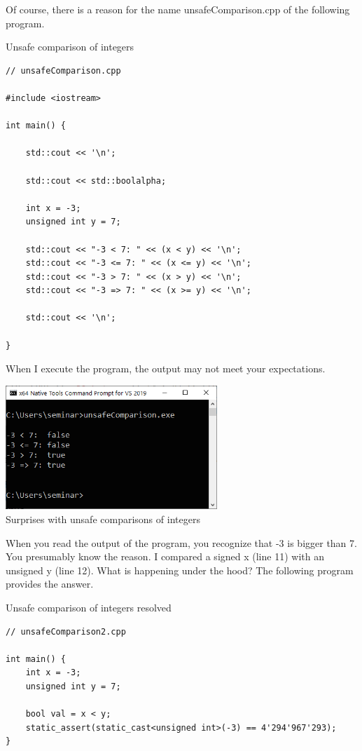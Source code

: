 Of course, there is a reason for the name unsafeComparison.cpp of the following program.

\noindent
Unsafe comparison of integers
\begin{lstlisting}[style=styleCXX]
// unsafeComparison.cpp

#include <iostream>

int main() {
	
	std::cout << '\n';
	
	std::cout << std::boolalpha;
	
	int x = -3;
	unsigned int y = 7;
	
	std::cout << "-3 < 7: " << (x < y) << '\n';
	std::cout << "-3 <= 7: " << (x <= y) << '\n';
	std::cout << "-3 > 7: " << (x > y) << '\n';
	std::cout << "-3 => 7: " << (x >= y) << '\n';
	
	std::cout << '\n';

}
\end{lstlisting}

When I execute the program, the output may not meet your expectations.

\begin{center}
\includegraphics[width=0.6\textwidth]{content/3/chapter5/images/16.png}\\
Surprises with unsafe comparisons of integers
\end{center}

When you read the output of the program, you recognize that -3 is bigger than 7. You presumably know the reason. I compared a signed x (line 11) with an unsigned y (line 12). What is happening under the hood? The following program provides the answer.

\noindent
Unsafe comparison of integers resolved
\begin{lstlisting}[style=styleCXX]
// unsafeComparison2.cpp

int main() {
	int x = -3;
	unsigned int y = 7;
	
	bool val = x < y;
	static_assert(static_cast<unsigned int>(-3) == 4'294'967'293);
}
\end{lstlisting}

